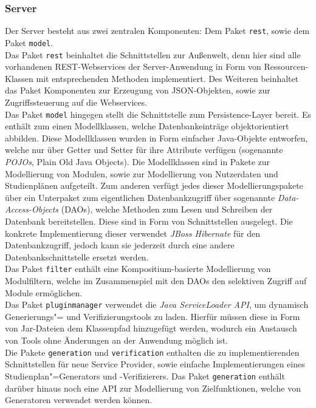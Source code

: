 \subsubsection{Server}
Der Server besteht aus zwei zentralen Komponenten: Dem Paket \texttt{rest}, sowie dem Paket \texttt{model}. \\
Das Paket \texttt{rest} beinhaltet die Schnittstellen zur Außenwelt, denn hier sind alle vorhandenen REST-Webservices der Server-Anwendung in Form von Ressourcen-Klassen mit entsprechenden Methoden implementiert. Des Weiteren beinhaltet das Paket Komponenten zur Erzeugung von JSON-Objekten, sowie zur Zugriffssteuerung auf die Webservices. \\
Das Paket \texttt{model} hingegen stellt die Schnittstelle zum Persistence-Layer bereit. Es enthält zum einen Modellklassen, welche Datenbankeinträge objektorientiert abbilden. Diese Modellklassen wurden in Form einfacher Java-Objekte entworfen, welche nur über Getter und Setter für ihre Attribute verfügen (sogenannte \emph{POJOs}, Plain Old Java Objects). Die Modellklassen sind in Pakete zur Modellierung von Modulen, sowie zur Modellierung von Nutzerdaten und Studienplänen aufgeteilt. Zum anderen verfügt jedes dieser Modellierungspakete über ein Unterpaket zum eigentlichen Datenbankzugriff über sogenannte \emph{Data-Access-Objects} (DAOs), welche Methoden zum Lesen und Schreiben der Datenbank bereitstellen. Diese sind in Form von Schnittstellen ausgelegt. Die konkrete Implementierung dieser verwendet \emph{JBoss Hibernate} für den Datenbankzugriff, jedoch kann sie jederzeit durch eine andere Datenbankschnittstelle ersetzt werden.\\
Das Paket \texttt{filter} enthält eine Kompositium-basierte Modellierung von Modulfiltern, welche im Zusammenspiel mit den DAOs den selektiven Zugriff auf Module ermöglichen. \\
Das Paket \texttt{pluginmanager} verwendet die \emph{Java ServiceLoader API}, um dynamisch Generierungs"= und Verifizierungstools zu laden. Hierfür müssen diese in Form von Jar-Dateien dem Klassenpfad hinzugefügt werden, wodurch ein Austausch von Tools ohne Änderungen an der Anwendung möglich ist. \\
Die Pakete \texttt{generation} und \texttt{verification} enthalten die zu implementierenden Schnittstellen für neue Service Provider, sowie einfache Implementierungen eines Studienplan"=Generators und -Verifizierers. Das Paket \texttt{generation} enthält darüber hinaus noch eine API zur Modellierung von Zielfunktionen, welche von Generatoren verwendet werden können.
